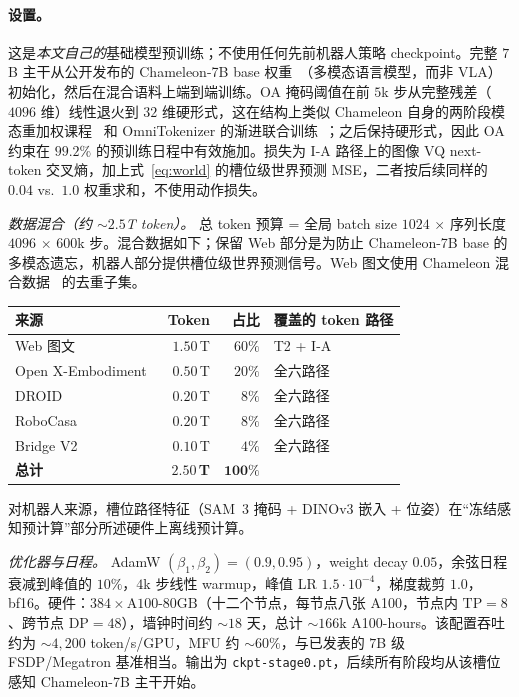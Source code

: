 \paragraph{设置。}
这是\emph{本文自己的}基础模型预训练；不使用任何先前机器人策略 checkpoint。完整 $7$B 主干从公开发布的 Chameleon-7B base 权重~\citep{chameleon}（多模态语言模型，而非 VLA）初始化，然后在混合语料上端到端训练。OA 掩码阈值在前 $5$k 步从完整残差（$4096$ 维）线性退火到 $32$ 维硬形式，这在结构上类似 Chameleon 自身的两阶段模态重加权课程~\citep{chameleon} 和 OmniTokenizer 的渐进联合训练~\citep{omnitokenizer}；之后保持硬形式，因此 OA 约束在 $99.2\%$ 的预训练日程中有效施加。损失为 I-A 路径上的图像 VQ next-token 交叉熵，加上式~\eqref{eq:world} 的槽位级世界预测 MSE，二者按后续同样的 $0.04$ vs.\ $1.0$ 权重求和，不使用动作损失。

\noindent\emph{数据混合（约 $\sim\!2.5$T token）。}
总 token 预算 = 全局 batch size $1024$ $\times$ 序列长度 $4096$ $\times$ $600$k 步。混合数据如下；保留 Web 部分是为防止 Chameleon-7B base 的多模态遗忘，机器人部分提供槽位级世界预测信号。Web 图文使用 Chameleon 混合数据~\citep{chameleon} 的去重子集。
\begin{center}
\small
\setlength{\tabcolsep}{4pt}
\begin{tabular}{lrrl}
\toprule
来源 & Token & 占比 & 覆盖的 token 路径 \\
\midrule
Web 图文                              & $1.50$\,T & $60\%$ & T2 + I-A \\
Open X-Embodiment~\citep{openx}             & $0.50$\,T & $20\%$ & 全六路径 \\
DROID~\citep{droid}                         & $0.20$\,T & $8\%$  & 全六路径 \\
RoboCasa~\citep{robocasa}                   & $0.20$\,T & $8\%$  & 全六路径 \\
Bridge V2~\citep{bridgev2}                  & $0.10$\,T & $4\%$  & 全六路径 \\
\midrule
\textbf{总计}                              & $\mathbf{2.50}$\,\textbf{T} & $\mathbf{100\%}$ & \\
\bottomrule
\end{tabular}
\end{center}
对机器人来源，槽位路径特征（SAM~3 掩码 + DINOv3 嵌入 + 位姿）在“冻结感知预计算”部分所述硬件上离线预计算。

\noindent\emph{优化器与日程。}
AdamW $(\beta_1,\beta_2){=}(0.9,0.95)$，weight decay $0.05$，余弦日程衰减到峰值的 $10\%$，$4$k 步线性 warmup，峰值 LR $1.5\!\cdot\!10^{-4}$，梯度裁剪 $1.0$，bf16。硬件：$384\!\times\!\text{A100-80GB}$（十二个节点，每节点八张 A100，节点内 $\text{TP}{=}8$、跨节点 $\text{DP}{=}48$），墙钟时间约 $\sim\!18$ 天，总计 $\sim\!166$k A100-hours。该配置吞吐约为 $\sim\!4{,}200$ token/s/GPU，MFU 约 $\sim\!60\%$，与已发表的 $7$B 级 FSDP/Megatron 基准相当。输出为 \texttt{ckpt-stage0.pt}，后续所有阶段均从该槽位感知 Chameleon-7B 主干开始。


